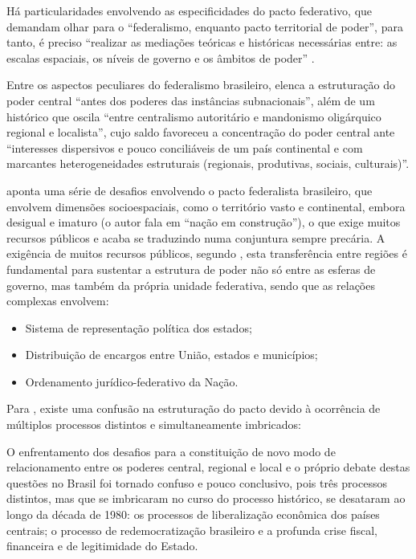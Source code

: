 \documentclass[
article,			%
11pt,				%
oneside,			%
a4paper,			%
english,			%
brazil,				%
sumario=tradicional
]{abntex2}
\begin{document}
	Há particularidades envolvendo as especificidades do pacto federativo, que demandam olhar para o ``federalismo, enquanto pacto territorial de poder'', para tanto, é preciso ``realizar as mediações teóricas e históricas necessárias entre: as escalas espaciais, os níveis de governo e os âmbitos de poder'' \cite[p. 116]{brandao2011a}.
	
	Entre os aspectos peculiares do federalismo brasileiro,  elenca a estruturação do poder central ``antes dos poderes das instâncias subnacionais'', além de um histórico que oscila ``entre centralismo autoritário e mandonismo oligárquico regional e localista'', cujo saldo favoreceu a concentração do poder central ante ``interesses dispersivos e pouco conciliáveis de um país continental e com marcantes heterogeneidades estruturais (regionais, produtivas, sociais, culturais)''.
	
	 aponta uma série de desafios envolvendo o pacto federalista brasileiro, que envolvem dimensões socioespaciais, como o território vasto e continental, embora desigual e imaturo (o autor fala em ``nação em construção''), o que exige muitos recursos públicos e acaba se traduzindo numa conjuntura sempre precária. A exigência de muitos recursos públicos, segundo , esta transferência entre regiões é fundamental para sustentar a estrutura de poder não só entre as esferas de governo, mas também da própria unidade federativa, sendo que as relações complexas envolvem:
	
	\begin{itemize}
		\item Sistema de representação política dos estados;
		\item Distribuição de encargos entre União, estados e municípios;
		\item Ordenamento jurídico-federativo da Nação.
	\end{itemize}

	Para , existe uma confusão na estruturação do pacto devido à ocorrência de múltiplos processos distintos e simultaneamente imbricados:
	
	\begin{citacao}
		O enfrentamento dos desafios para a constituição de novo modo de relacionamento entre os poderes central, regional e local e o próprio debate destas questões no Brasil foi tornado confuso e pouco conclusivo, pois três processos distintos, mas que se imbricaram no curso do processo histórico, se desataram ao longo da década de 1980: os processos de liberalização econômica dos países centrais; o processo de redemocratização brasileiro e a profunda crise fiscal, financeira e de legitimidade do Estado.
	\end{citacao}
\end{document}
